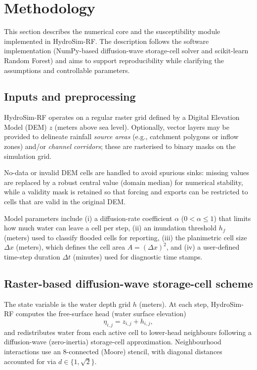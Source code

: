 \documentclass[a4paper,fleqn]{cas-sc}
\begin{document}
\section{Methodology}\label{sec:methodology}
This section describes the numerical core and the susceptibility module implemented in HydroSim-RF. The description follows the software implementation (NumPy-based diffusion-wave storage-cell solver and scikit-learn Random Forest) and aims to support reproducibility while clarifying the assumptions and controllable parameters.

\subsection{Inputs and preprocessing}\label{subsec:methodology_inputs}
HydroSim-RF operates on a regular raster grid defined by a Digital Elevation Model (DEM) $z$ (meters above sea level). Optionally, vector layers may be provided to delineate rainfall \emph{source areas} (e.g., catchment polygons or inflow zones) and/or \emph{channel corridors}; these are rasterised to binary masks on the simulation grid.

No-data or invalid DEM cells are handled to avoid spurious sinks: missing values are replaced by a robust central value (domain median) for numerical stability, while a validity mask is retained so that forcing and exports can be restricted to cells that are valid in the original DEM.

Model parameters include (i) a diffusion-rate coefficient $\alpha$ ($0 < \alpha \le 1$) that limits how much water can leave a cell per step, (ii) an inundation threshold $h_f$ (meters) used to classify flooded cells for reporting, (iii) the planimetric cell size $\Delta x$ (meters), which defines the cell area $A = (\Delta x)^2$, and (iv) a user-defined time-step duration $\Delta t$ (minutes) used for diagnostic time stamps.

\subsection{Raster-based diffusion-wave storage-cell scheme}\label{subsec:methodology_model}
The state variable is the water depth grid $h$ (meters). At each step, HydroSim-RF computes the free-surface head (water surface elevation)
\begin{equation}
\eta_{i,j} = z_{i,j} + h_{i,j},
\end{equation}
and redistributes water from each active cell to lower-head neighbours following a diffusion-wave (zero-inertia) storage-cell approximation. Neighbourhood interactions use an 8-connected (Moore) stencil, with diagonal distances accounted for via $d \in \{1, \sqrt{2}\}$.
\end{document}
